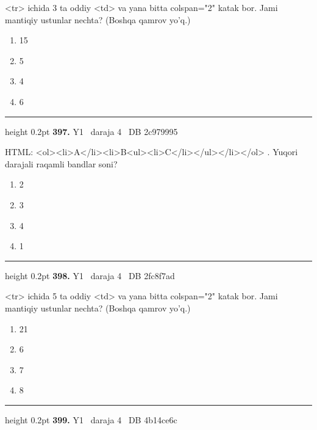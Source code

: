 \documentclass[10pt,a4paper,oneside]{article}
\begin{document}
\par
\textless{}tr\textgreater{} ichida 3 ta oddiy \textless{}td\textgreater{} va yana bitta colspan="2" katak bor. Jami mantiqiy ustunlar nechta? (Boshqa qamrov yo'q.)
\begin{enumerate}[label=\Alph*),leftmargin=9mm]
\item 15
\item 5
\item 4
\item 6
\end{enumerate}
\vspace{2mm}\hrule height 0.2pt \vspace{4mm}
\hypertarget{q397}{\textbf{\color{ink}397.}}  {\color{muted}\scriptsize Y1 \textbullet\ daraja 4 \textbullet\ DB 2c979995}
\par
HTML: \textless{}ol\textgreater{}\textless{}li\textgreater{}A\textless{}/li\textgreater{}\textless{}li\textgreater{}B\textless{}ul\textgreater{}\textless{}li\textgreater{}C\textless{}/li\textgreater{}\textless{}/ul\textgreater{}\textless{}/li\textgreater{}\textless{}/ol\textgreater{} . Yuqori darajali raqamli bandlar soni?
\begin{enumerate}[label=\Alph*),leftmargin=9mm]
\item 2
\item 3
\item 4
\item 1
\end{enumerate}
\vspace{2mm}\hrule height 0.2pt \vspace{4mm}
\hypertarget{q398}{\textbf{\color{ink}398.}}  {\color{muted}\scriptsize Y1 \textbullet\ daraja 4 \textbullet\ DB 2fc8f7ad}
\par
\textless{}tr\textgreater{} ichida 5 ta oddiy \textless{}td\textgreater{} va yana bitta colspan="2" katak bor. Jami mantiqiy ustunlar nechta? (Boshqa qamrov yo'q.)
\begin{enumerate}[label=\Alph*),leftmargin=9mm]
\item 21
\item 6
\item 7
\item 8
\end{enumerate}
\vspace{2mm}\hrule height 0.2pt \vspace{4mm}
\hypertarget{q399}{\textbf{\color{ink}399.}}  {\color{muted}\scriptsize Y1 \textbullet\ daraja 4 \textbullet\ DB 4b14ce6c}
\end{document}
